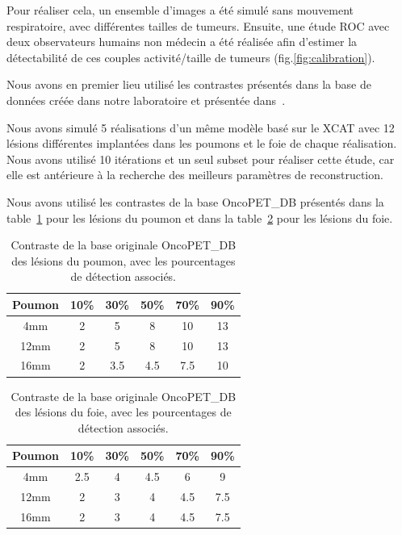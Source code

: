 Pour réaliser cela, un ensemble d'images a été simulé sans mouvement respiratoire, avec différentes tailles de tumeurs. Ensuite, une étude ROC avec deux observateurs humains non médecin a été réalisée afin d'estimer la détectabilité de ces couples activité/taille de tumeurs (fig.\ref{fig:calibration}). 

Nous avons en premier lieu utilisé les contrastes présentés dans la base de données créée dans notre laboratoire et présentée dans~\cite{tomei2010oncopet_db}.

Nous avons simulé 5 réalisations d'un même modèle basé sur le XCAT avec 12 lésions différentes implantées dans les poumons et le foie de chaque réalisation. Nous avons utilisé 10 itérations et un seul subset pour réaliser cette étude, car elle est antérieure à la recherche des meilleurs paramètres de reconstruction.

Nous avons utilisé les contrastes de la base OncoPET\_DB présentés dans la table~\ref{tab:contrastePoumonOrig} pour les lésions du poumon et dans la table~\ref{tab:contrasteFoieOrig} pour les lésions du foie.

\begin{table}
\centering
\begin{tabular}{|c||c|c|c|c|c|}
 \hline
Poumon	& 10\% & 30\% & 50\% & 70\% & 90\% \\
\hline
4mm	& 2    &  5   &  8   & 10   & 13   \\
\hline
12mm    & 2    &  5   &  8   & 10   & 13   \\
\hline
16mm    & 2    &  3.5 &  4.5 & 7.5  & 10   \\
\hline
\end{tabular}
\caption[Contraste de la base originale OncoPET\_DB des lésions du poumon pour létude de détectabilité]{Contraste de la base originale OncoPET\_DB des lésions du poumon, avec les pourcentages de détection associés.}
\label{tab:contrastePoumonOrig}
\end{table}

\begin{table}
\centering
\begin{tabular}{|c||c|c|c|c|c|}
 \hline
Poumon	& 10\% & 30\% & 50\% & 70\% & 90\% \\
\hline
4mm	& 2.5    &  4   &  4.5   & 6   & 9   \\
\hline
12mm    & 2    &  3   &  4   & 4.5   & 7.5   \\
\hline
16mm    & 2    &  3   &  4   & 4.5   & 7.5   \\
\hline
\end{tabular}
\caption[Contraste de la base originale OncoPET\_DB des lésions du foie pour létude de détectabilité]{Contraste de la base originale OncoPET\_DB des lésions du foie, avec les pourcentages de détection associés.}
\label{tab:contrasteFoieOrig}
\end{table}

